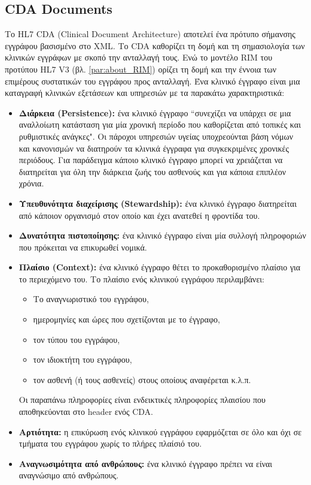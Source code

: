 	\subsection{CDA Documents}
	Το HL7 CDA (Clinical Document Architecture) αποτελεί ένα πρότυπο σήμανσης εγγράφου βασισμένο στο XML. Το CDA καθορίζει τη δομή και τη σημασιολογία των κλινικών εγγράφων με σκοπό την ανταλλαγή τους\cite{boone2011cda}. Ενώ το μοντέλο RIM του προτύπου HL7 V3 (βλ. \ref{par:about_RIM}) ορίζει τη δομή και την έννοια των επιμέρους συστατικών του εγγράφου προς ανταλλαγή. Ένα κλινικό έγγραφο είναι μια καταγραφή κλινικών εξετάσεων και υπηρεσιών με τα παρακάτω χαρακτηριστικά\cite{boone2011cda}:
	\begin{itemize}
		\item \textbf{Διάρκεια (Persistence): } ένα κλινικό έγγραφο ``συνεχίζει να υπάρχει σε μια αναλλοίωτη κατάσταση για μία χρονική περίοδο που καθορίζεται από τοπικές και ρυθμιστικές ανάγκες"\cite{dolin2001hl7}. Οι πάροχοι υπηρεσιών υγείας υποχρεούνται βάση νόμων και κανονισμών να διατηρούν τα κλινικά έγγραφα για συγκεκριμένες χρονικές περιόδους. Για παράδειγμα κάποιο κλινικό έγγραφο μπορεί να χρειάζεται να διατηρείται για όλη την διάρκεια ζωής του ασθενούς και για κάποια επιπλέον χρόνια.
		\item \textbf{Υπευθυνότητα διαχείρισης (Stewardship): } ένα κλινικό έγγραφο διατηρείται από κάποιον οργανισμό στον οποίο και έχει ανατεθεί η φροντίδα του.
		\item \textbf{Δυνατότητα πιστοποίησης: } ένα κλινικό έγγραφο είναι μία συλλογή πληροφοριών που πρόκειται να επικυρωθεί νομικά. 
		\item \textbf{Πλαίσιο (Context): } ένα κλινικό έγγραφο θέτει το προκαθορισμένο πλαίσιο για το περιεχόμενο του. Το πλαίσιο ενός κλινικού εγγράφου περιλαμβάνει:
		\begin{itemize}
			\item Το αναγνωριστικό του εγγράφου,
			\item ημερομηνίες και ώρες που σχετίζονται με το έγγραφο,
			\item τον τύπου του εγγράφου,
			\item τον ιδιοκτήτη του εγγράφου,
			\item τον ασθενή (ή τους ασθενείς) στους οποίους αναφέρεται κ.λ.π.
		\end{itemize}
		Οι παραπάνω πληροφορίες είναι ενδεικτικές πληροφορίες πλαισίου που αποθηκεύονται στο header ενός CDA.
		\item \textbf{Αρτιότητα: } η επικύρωση ενός κλινικού εγγράφου εφαρμόζεται σε όλο και όχι σε τμήματα του εγγράφου χωρίς το πλήρες  πλαίσιό του.
		\item \textbf{Αναγνωσιμότητα από ανθρώπους: } ένα κλινικό έγγραφο πρέπει να είναι αναγνώσιμο από ανθρώπους.
	\end{itemize}
	
